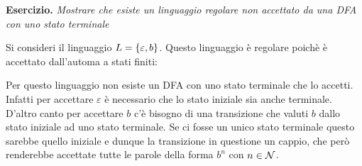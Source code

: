 \textbf{Esercizio. } \textit{Mostrare che esiste un linguaggio regolare non accettato da una DFA con uno stato terminale}

Si consideri il linguaggio \(L=\displaystyle{\left\{{\varepsilon, b}\right\}}\). Questo linguaggio è regolare poichè è accettato dall'automa a stati finiti:

\begin{figure}[ht]
    \centering
\end{figure}

Per questo linguaggio non esiste un DFA con uno stato terminale che lo accetti. Infatti per accettare \(\varepsilon\) è necessario che lo stato iniziale sia anche terminale. D'altro canto per accettare \(b\) c'è bisogno di una transizione che valuti \(b\) dallo stato iniziale ad uno stato terminale. Se ci fosse un unico stato terminale questo sarebbe quello iniziale e dunque la transizione in questione un cappio, che però renderebbe accettate tutte le parole della forma \(b^n\) con \(n \in \mathcal{N}\).

\newpage

